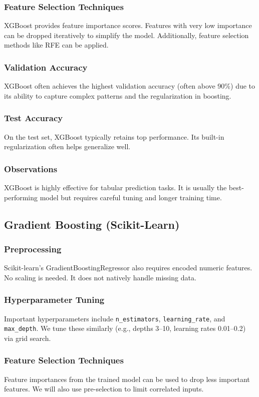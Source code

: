 \documentclass[12pt]{article}
\begin{document}
\subsubsection{Feature Selection Techniques}
XGBoost provides feature importance scores. Features with very low importance can be dropped iteratively to simplify the model. Additionally, feature selection methods like RFE can be applied.
\subsubsection{Validation Accuracy}
XGBoost often achieves the highest validation accuracy (often above 90\%) due to its ability to capture complex patterns and the regularization in boosting.
\subsubsection{Test Accuracy}
On the test set, XGBoost typically retains top performance. Its built-in regularization often helps generalize well.
\subsubsection{Observations}
XGBoost is highly effective for tabular prediction tasks. It is usually the best-performing model but requires careful tuning and longer training time.

\subsection{Gradient Boosting (Scikit-Learn)}
\subsubsection{Preprocessing}
Scikit-learn's GradientBoostingRegressor also requires encoded numeric features. No scaling is needed. It does not natively handle missing data.
\subsubsection{Hyperparameter Tuning}
Important hyperparameters include \texttt{n\_estimators}, \texttt{learning\_rate}, and \texttt{max\_depth}. We tune these similarly (e.g., depths 3--10, learning rates 0.01--0.2) via grid search.
\subsubsection{Feature Selection Techniques}
Feature importances from the trained model can be used to drop less important features. We will also use pre-selection to limit correlated inputs.
\end{document}
